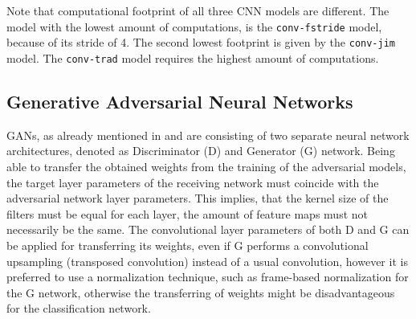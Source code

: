 Note that computational footprint of all three CNN models are different.
The model with the lowest amount of computations, is the \texttt{conv-fstride} model, because of its stride of 4.
The second lowest footprint is given by the \texttt{conv-jim} model.
The \texttt{conv-trad} model requires the highest amount of computations.



\subsection{Generative Adversarial Neural Networks}\label{sec:nn_arch_adv}
GANs, as already mentioned in  and  are consisting of two separate neural network architectures, denoted as Discriminator (D) and Generator (G) network.
Being able to transfer the obtained weights from the training of the adversarial models, the target layer parameters of the receiving network must coincide with the adversarial network layer parameters.
This implies, that the kernel size of the filters must be equal for each layer, the amount of feature maps must not necessarily be the same.
The convolutional layer parameters of both D and G can be applied for transferring its weights, even if G performs a convolutional upsampling (transposed convolution) instead of a usual convolution, however it is preferred to use a normalization technique, such as frame-based normalization for the G network, otherwise the transferring of weights might be disadvantageous for the classification network.

